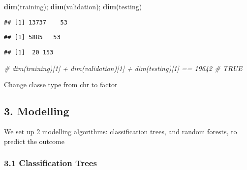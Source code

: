 \documentclass[
]{article}
\newenvironment{Shaded}{\begin{snugshade}}{\end{snugshade}}
\newcommand{\CommentTok}[1]{\textcolor[rgb]{0.56,0.35,0.01}{\textit{#1}}}
\newcommand{\KeywordTok}[1]{\textcolor[rgb]{0.13,0.29,0.53}{\textbf{#1}}}
\newcommand{\NormalTok}[1]{#1}
\newcommand{\OperatorTok}[1]{\textcolor[rgb]{0.81,0.36,0.00}{\textbf{#1}}}
\newcommand{\StringTok}[1]{\textcolor[rgb]{0.31,0.60,0.02}{#1}}
\begin{document}
\begin{Shaded}
\begin{Highlighting}[]
\KeywordTok{dim}\NormalTok{(training); }\KeywordTok{dim}\NormalTok{(validation); }\KeywordTok{dim}\NormalTok{(testing)}
\end{Highlighting}
\end{Shaded}

\begin{verbatim}
## [1] 13737    53
\end{verbatim}

\begin{verbatim}
## [1] 5885   53
\end{verbatim}

\begin{verbatim}
## [1]  20 153
\end{verbatim}

\begin{Shaded}
\begin{Highlighting}[]
\CommentTok{# dim(training)[1] + dim(validation)[1] + dim(testing)[1] == 19642 # TRUE}
\end{Highlighting}
\end{Shaded}

Change classe type from chr to factor

\begin{Shaded}
\end{Shaded}

\hypertarget{modelling}{%
\subsection{3. Modelling}\label{modelling}}

We set up 2 modelling algorithms: classification trees, and random
forests, to predict the outcome

\hypertarget{classification-trees}{%
\subsubsection{3.1 Classification Trees}\label{classification-trees}}
\end{document}
